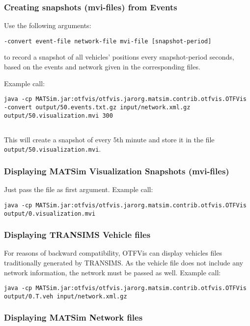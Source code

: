 \subsubsection{Creating snapshots (mvi-files) from Events}

Use the following arguments:
\begin{verbatim}
-convert event-file network-file mvi-file [snapshot-period]
\end{verbatim}

to record a snapshot of all vehicles' positions every snapshot-period  seconds, based on the events and network given in the corresponding  files.

Example call:
\begin{verbatim}
java -cp MATSim.jar:otfvis/otfvis.jarorg.matsim.contrib.otfvis.OTFVis -convert output/50.events.txt.gz input/network.xml.gz output/50.visualization.mvi 300


\end{verbatim}

This will create a snapshot of every 5th minute and store it in the file 
\texttt{output/50.visualization.mvi}.

\subsubsection{Displaying MATSim Visualization Snapshots (mvi-files)}

Just pass the file as first argument. Example call:
\begin{verbatim}
java -cp MATSim.jar:otfvis/otfvis.jarorg.matsim.contrib.otfvis.OTFVis output/0.visualization.mvi
\end{verbatim}

\subsubsection{Displaying TRANSIMS Vehicle files}

For reasons of backward compatibility, OTFVis can display vehicles  files traditionally generated by TRANSIMS. As the vehicle file does not  include any network information, the network must be passed as well.  Example call:
\begin{verbatim}
java -cp MATSim.jar:otfvis/otfvis.jarorg.matsim.contrib.otfvis.OTFVis output/0.T.veh input/network.xml.gz
\end{verbatim}

\subsubsection{Displaying MATSim Network files}

